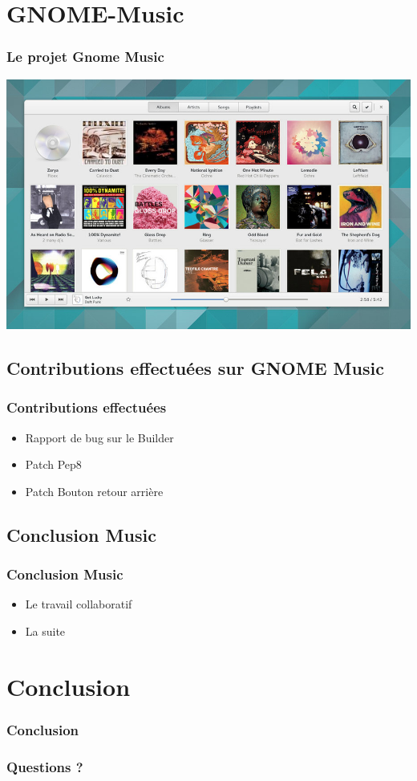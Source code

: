 \documentclass{beamer}
\begin{document}
\section{GNOME-Music}
\begin{frame}
  \frametitle{Le projet Gnome Music}
  \includegraphics[scale=0.325]{images/gnome-music-app.png}
\end{frame}

\subsection{Contributions effectuées sur GNOME Music}
\begin{frame}
  \frametitle{Contributions effectuées}
  \begin{itemize}
  \item Rapport de bug sur le Builder
  \item Patch Pep8
  \item Patch Bouton retour arrière
  \end{itemize}
\end{frame}

\subsection{Conclusion Music}
\begin{frame}
  \frametitle{Conclusion Music}
  \begin{itemize}
  \item Le travail collaboratif
  \item La suite
  \end{itemize}
\end{frame}

\section{Conclusion}
\begin{frame}
  \frametitle{Conclusion}
\end{frame}

\begin{frame}
  \frametitle{Questions ?}
\end{frame}
\end{document}
